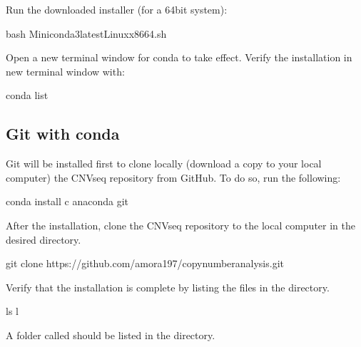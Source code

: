 \documentclass[letterpaper,10pt,english]{sphinxhowto}
\begin{document}
\sphinxAtStartPar
Run the downloaded installer (for a 64\sphinxhyphen{}bit system):

\begin{sphinxVerbatim}[commandchars=\\\{\}]
\PYGZdl{} bash Miniconda3\PYGZhy{}latest\PYGZhy{}Linux\PYGZhy{}x86\PYGZus{}64.sh
\end{sphinxVerbatim}

\sphinxAtStartPar
Open a new terminal window for conda to take effect. Verify the installation in new terminal window with:

\begin{sphinxVerbatim}[commandchars=\\\{\}]
\PYGZdl{} conda list
\end{sphinxVerbatim}


\subsection{Git with conda}
\label{\detokenize{index:git-with-conda}}
\sphinxAtStartPar
Git will be installed first to clone locally (download a copy to your local computer) the CNV\sphinxhyphen{}seq repository from GitHub. To do so, run the following:

\begin{sphinxVerbatim}[commandchars=\\\{\}]
\PYGZdl{} conda install \PYGZhy{}c anaconda git
\end{sphinxVerbatim}

\sphinxAtStartPar
After the installation, clone the CNV\sphinxhyphen{}seq repository to the local computer in the desired directory.

\begin{sphinxVerbatim}[commandchars=\\\{\}]
\PYGZdl{} git clone https://github.com/amora197/copy\PYGZhy{}number\PYGZhy{}analysis.git
\end{sphinxVerbatim}

\sphinxAtStartPar
Verify that the installation is complete by listing the files in the directory.

\begin{sphinxVerbatim}[commandchars=\\\{\}]
\PYGZdl{} ls \PYGZhy{}l
\end{sphinxVerbatim}

\sphinxAtStartPar
A folder called  should be listed in the directory.
\end{document}
